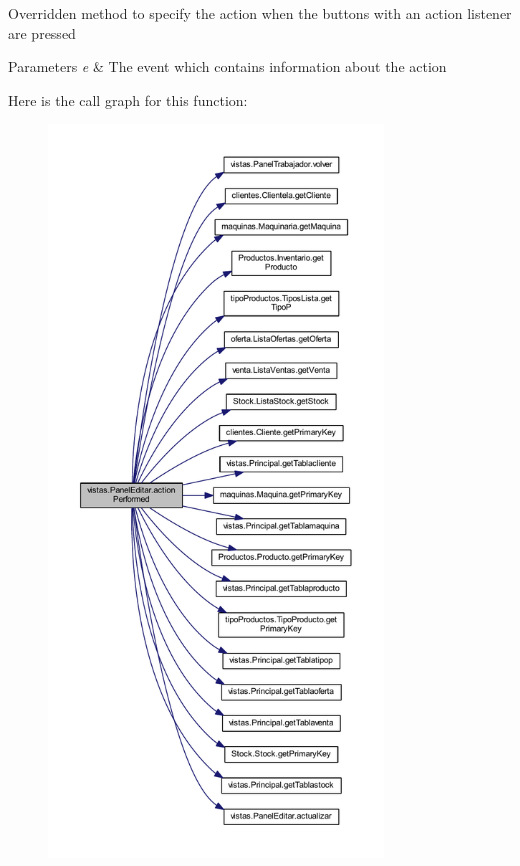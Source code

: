 Overridden method to specify the action when the buttons with an action listener are pressed 
\begin{DoxyParams}{Parameters}
{\em e} & The event which contains information about the action \\
\hline
\end{DoxyParams}
Here is the call graph for this function\+:
\nopagebreak
\begin{figure}[H]
\begin{center}
\leavevmode
\includegraphics[height=550pt]{classvistas_1_1_panel_editar_abfa1e278ba63d7cf2a14c02804dcadf1_cgraph}
\end{center}
\end{figure}
\mbox{\label{classvistas_1_1_panel_editar_a785d026660ee2531aa4fbd29d1377370}} 
